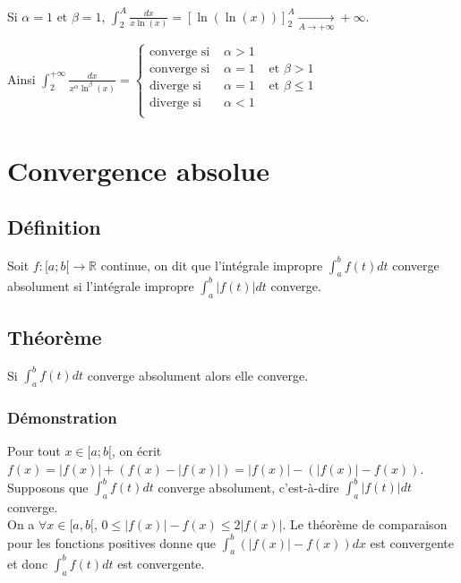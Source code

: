 \documentclass[a4paper,10pt]{book} %
\newcommand{\R}{\mathbb{R}}
\newcommand{\abs}[1]{\left|#1\right|}
\newcommand{\displayAmath}{\displaystyle}
\begin{document}
\begin{enumerate}
Si $\alpha=1$ et $\beta=1$, $\displayAmath\int_2^A\frac{dx}{x\ln(x)}=[\ln(\ln(x))]_2^A \underset{A\rightarrow +\infty}{\rightarrow}+\infty$.\\\smallskip

Ainsi $\displayAmath\int_2^{+\infty} \frac{dx}{x^\alpha\ln^\beta(x)}=\left\{\begin{array}{rrl}
	\text{converge si }&\alpha>1 \\
	\text{converge si }&\alpha=1&\text{ et }\beta>1\\
	\text{diverge si }&\alpha=1&\text{ et }\beta\leq 1\\
	\text{diverge si }&\alpha<1\\
\end{array}\right.$
\end{enumerate}

\newpage

\section{Convergence absolue}
\subsection{Définition}
Soit $f:[a;b[\rightarrow \R$ continue, on dit que l'intégrale impropre $\displayAmath\int_a^bf(t)dt$ converge absolument si l'intégrale impropre $\displayAmath\int_a^b\abs{f(t)}dt$ converge.

\subsection{Théorème}
Si $\displayAmath\int_a^bf(t)dt$ converge absolument alors elle converge.

\subsubsection{Démonstration}
Pour tout $x \in[a;b[$, on écrit $f(x)=\abs{f(x)}+(f(x)-\abs{f(x)})=\abs{f(x)}-(\abs{f(x)}-f(x))$.\\

Supposons que $\displayAmath\int_a^bf(t)dt$ converge absolument, c'est-à-dire $\displayAmath\int_a^b\abs{f(t)}dt$ converge.\\

On a $\forall x\in[a,b[$, $0\leq \abs{f(x)}-f(x)\leq 2\abs{f(x)}$.
Le théorème de comparaison pour les fonctions positives donne que $\displayAmath\int_a^b(\abs{f(x)}-f(x))dx$ est convergente et donc $\displayAmath\int_a^bf(t)dt$ est convergente.
\end{document}
